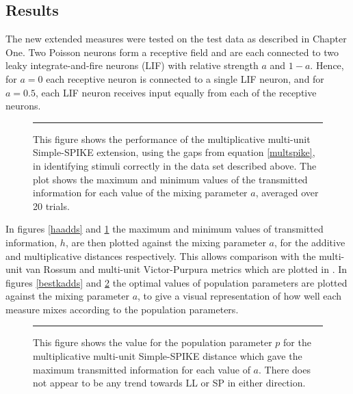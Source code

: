  \subsection{Results}
 The new extended measures were tested on the \citep{HoughtonSen2008a} test data as described in Chapter One. Two Poisson neurons form a receptive field and are each connected to two leaky integrate-and-fire neurons (LIF) with relative strength $a$ and $1-a$.  Hence, for $a=0$ each receptive neuron is connected to a single LIF neuron, and for $a=0.5$, each LIF neuron receives input equally from each of the receptive neurons.
 
\begin{figure}[thb]
\begin{center}
\resizebox{0.75\textwidth}{!}{}
\end{center}
\rule{31.5em}{0.5pt}
\caption{\label{hamults}This figure shows the performance of the multiplicative multi-unit Simple-SPIKE extension, using the gaps from equation \ref{multspike}, in identifying stimuli correctly in the data set described above.  The plot shows the maximum and minimum values of the transmitted information for each value of the mixing parameter $a$, averaged over 20 trials.}
\end{figure}

In figures \ref{haadds} and \ref{hamults} the maximum and minimum values of transmitted information, $h$, are then plotted against the mixing parameter $a$, for the additive and multiplicative distances respectively.  This allows comparison with the multi-unit van Rossum and multi-unit Victor-Purpura metrics which are plotted in \citep{HoughtonSen2008a}.  In figures \ref{bestkadds} and \ref{bestpmults} the optimal values of population parameters are plotted against the mixing parameter $a$, to give a visual representation of how well each measure mixes according to the population parameters.
 
%
%
\newpage
\begin{figure}[htb]
\begin{center}
\resizebox{0.75\textwidth}{!}{}
\end{center}
\rule{31.5em}{0.5pt}
\caption{\label{bestpmults}This figure shows the value for the population parameter $p$ for the multiplicative multi-unit Simple-SPIKE distance which gave the maximum transmitted information for each value of $a$.  There does not appear to be any trend towards LL or SP in either direction.}
\end{figure}


